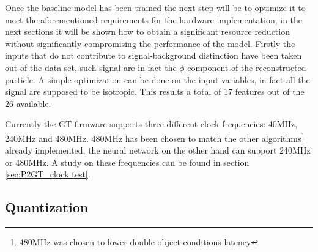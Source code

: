 \documentclass[../../main.tex]{subfiles}
\begin{document}
Once the baseline model has been trained the next step will be to optimize it to meet the aforementioned requirements for the hardware implementation, in the next sections it will be shown how to obtain a significant resource reduction without significantly compromising the performance of the model. 
Firstly the inputs that do not contribute to signal-background distinction have been taken out of the data set, such signal are in fact the $\phi$ component of the reconstructed particle. A simple optimization can be done on the input variables, in fact all the signal are supposed to be isotropic. This results a total of 17 features out of the 26 available.   

Currently the GT firmware supports three different clock frequencies: 40MHz, 240MHz and 480MHz. 480MHz has been chosen to match the other algorithms\footnote{480MHz was chosen to lower double object conditions latency} already implemented, the neural network on the other hand can support 240MHz or 480MHz. A study on these frequencies can be found in section \ref{sec:P2GT_clock test}.
    
\subsection{Quantization}
\label{sec:P2GT_Comp}
\end{document}
